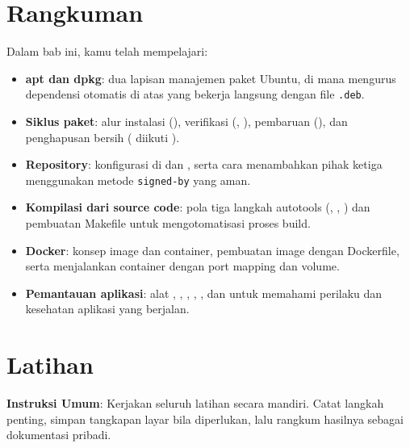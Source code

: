 \section{Rangkuman}
\label{sec:appmanagement-summary}

Dalam bab ini, kamu telah mempelajari:

\begin{itemize}[noitemsep,topsep=2pt]
    \item \textbf{apt dan dpkg}: dua lapisan manajemen paket Ubuntu, di mana
         mengurus dependensi otomatis di atas  yang bekerja
        langsung dengan file \texttt{.deb}.
    \item \textbf{Siklus paket}: alur instalasi (), verifikasi
        (, ), pembaruan (), dan
        penghapusan bersih ( diikuti ).
    \item \textbf{Repository}: konfigurasi di  dan
        , serta cara menambahkan  pihak ketiga
        menggunakan metode \texttt{signed-by} yang aman.
    \item \textbf{Kompilasi dari source code}: pola tiga langkah autotools
        (, , ) dan pembuatan
        Makefile untuk mengotomatisasi proses build.
    \item \textbf{Docker}: konsep image dan container, pembuatan image dengan
        Dockerfile, serta menjalankan container dengan port mapping dan volume.
    \item \textbf{Pemantauan aplikasi}: alat , , ,
        , , dan  untuk memahami perilaku dan
        kesehatan aplikasi yang berjalan.
\end{itemize}

\section{Latihan}
\label{sec:latihan-aplikasi}

\textbf{Instruksi Umum}: Kerjakan seluruh latihan secara mandiri. Catat langkah penting, simpan tangkapan layar bila diperlukan, lalu rangkum hasilnya sebagai dokumentasi pribadi.

